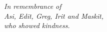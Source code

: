 \begin{flushright}
\textit{
In remembrance of\\
Asi, Edit, Greg, Irit and Maskit,\\
who showed kindness.
}
\end{flushright}
